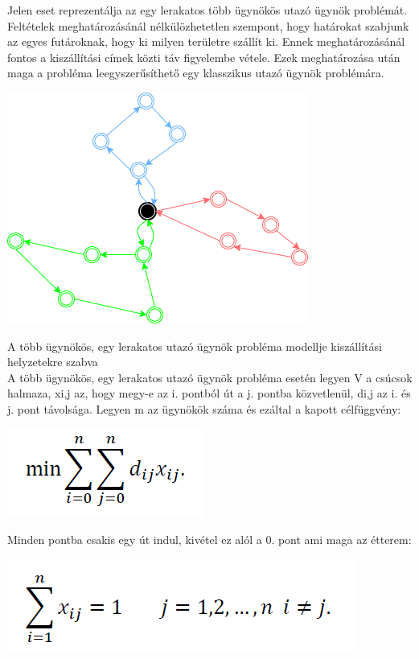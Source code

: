 

Jelen eset reprezentálja az egy lerakatos több ügynökös utazó ügynök problémát. Feltételek meghatározásánál nélkülözhetetlen szempont, hogy határokat szabjunk az egyes futároknak, hogy ki milyen területre szállít ki. Ennek meghatározásánál fontos a kiszállítási címek közti táv figyelembe vétele. Ezek meghatározása után maga a probléma leegyszerűsíthető egy klasszikus utazó ügynök problémára.

\includegraphics[scale=0.7]{images/Onedepotmtsp.png}


A több ügynökös, egy lerakatos utazó ügynök probléma modellje kiszállítási helyzetekre szabva\\

A több ügynökös, egy lerakatos utazó ügynök probléma esetén legyen V a csúcsok halmaza, xi,j az, hogy megy-e az i. pontból út a j. pontba közvetlenül, di,j az i. és j. pont távolsága. Legyen m az ügynökök száma és ezáltal a kapott célfüggvény:

\includegraphics[scale=0.5]{images/mtsp1.png}

Minden pontba csakis egy út indul, kivétel ez alól a 0. pont ami maga az étterem:

\includegraphics[scale=0.5]{images/mtsp2.png}

